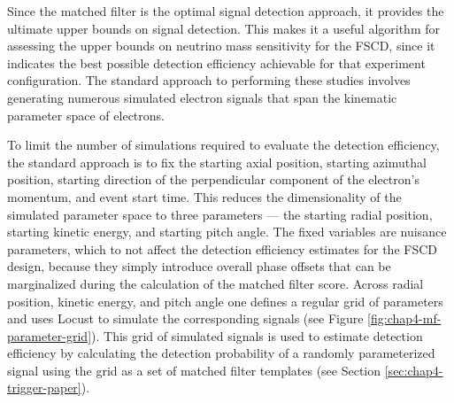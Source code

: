 Since the matched filter is the optimal signal detection approach, it provides the ultimate upper bounds on signal detection. This makes it a useful algorithm for assessing the upper bounds on neutrino mass sensitivity for the FSCD, since it indicates the best possible detection efficiency achievable for that experiment configuration. The standard approach to performing these studies involves generating numerous simulated electron signals that span the kinematic parameter space of electrons.%

To limit the number of simulations required to evaluate the detection efficiency, the standard approach is to fix the starting axial position, starting azimuthal position, starting direction of the perpendicular component of the electron's momentum, and event start time. This reduces the dimensionality of the simulated parameter space to three parameters --- the starting radial position, starting kinetic energy, and starting pitch angle. The fixed variables are nuisance parameters, which to not affect the detection efficiency estimates for the FSCD design, because they simply introduce overall phase offsets that can be marginalized during the calculation of the matched filter score. Across radial position, kinetic energy, and pitch angle one defines a regular grid of parameters and uses Locust to simulate the corresponding signals (see Figure \ref{fig:chap4-mf-parameter-grid}). This grid of simulated signals is used to estimate detection efficiency by calculating the detection probability of a randomly parameterized signal using the grid as a set of matched filter templates (see Section \ref{sec:chap4-trigger-paper}).


